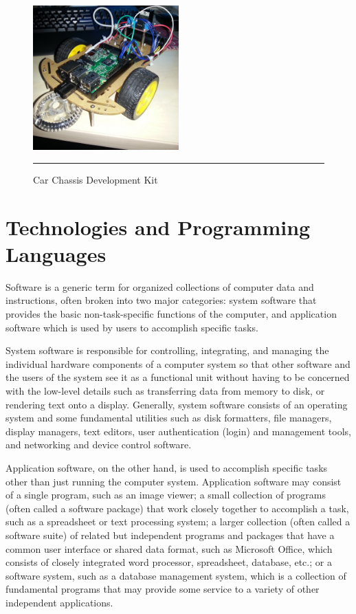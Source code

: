 \begin{figure}[h!]
        \centering
        \includegraphics[width=0.5\textwidth]{./Pictures/Car-Chassis-Kit3.jpg}
		\rule{0.5\textwidth}{1pt}
        \caption{Car Chassis Development Kit}
\end{figure}
\clearpage

\section{Technologies and Programming Languages}

Software is a generic term for organized collections of computer data and instructions, often broken into two major categories: system software that provides the basic non-task-specific functions of the computer, and application software which is used by users to accomplish specific tasks.

System software is responsible for controlling, integrating, and managing the individual hardware components of a computer system so that other software and the users of the system see it as a functional unit without having to be concerned with the low-level details such as transferring data from memory to disk, or rendering text onto a display. Generally, system software consists of an operating system and some fundamental utilities such as disk formatters, file managers, display managers, text editors, user authentication (login) and management tools, and networking and device control software.

Application software, on the other hand, is used to accomplish specific tasks other than just running the computer system. Application software may consist of a single program, such as an image viewer; a small collection of programs (often called a software package) that work closely together to accomplish a task, such as a spreadsheet or text processing system; a larger collection (often called a software suite) of related but independent programs and packages that have a common user interface or shared data format, such as Microsoft Office, which consists of closely integrated word processor, spreadsheet, database, etc.; or a software system, such as a database management system, which is a collection of fundamental programs that may provide some service to a variety of other independent applications.

